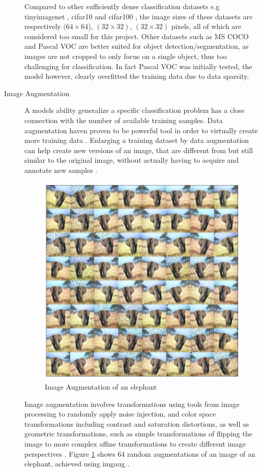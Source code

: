 \begin{description}
	Compared to other sufficiently dense classification datasets e.g \gls{tinyimagenet} \cite{li_cs231n:_2018}, \gls{cifar10} and \gls{cifar100} \cite{krizhevsky_cifar-10_nodate}, the image sizes of these datasets are respectively $(64\times 64$), $(32\times 32)$, $(32\times 32)$ pixels, all of which are considered too small  for this project. Other datasets such as MS COCO and Pascal VOC are better suited for object detection/segmentation, as images are not cropped to only focus on a single object, thus too challenging for classification. In fact Pascal VOC was initially tested, the model however, clearly overfitted the training data due to data sparsity. 
	
	\item[Image Augmentation] A models ability generalize a specific classification problem has a close connection with the number of available training samples. Data augmentation haven proven to be powerful tool in order to virtually create more training data \cite{perez_effectiveness_2017}. Enlarging a training dataset by data augmentation can help create new versions of an image, that are different from but still similar to the original image, without actually having to acquire and annotate new samples \cite{goodfellow_deep_2016}.  
	
	\begin{figure}[H]
		\centering
		\includegraphics[width=.7\linewidth]{figures/augmentation/augmentation_high_resolution.png}
		\caption[Image Augmentaion Example]{Image Augmentation of an elephant}
		\label{fig:augmentation}
	\end{figure}
	
	Image augmentation involves transformations using tools from image processing to randomly apply noise injection, and color space transformations including contrast and saturation distortions, as well as geometric transformations, such as simple transformations of flipping the image to more complex affine transformations to create different image perspectives \cite{shorten_survey_2019}. Figure \ref{fig:augmentation} shows 64 random augmentations of an image of an elephant, achieved using \gls{imgaug} \cite{jung_imgaug:_nodate}. 
	

\end{description}
